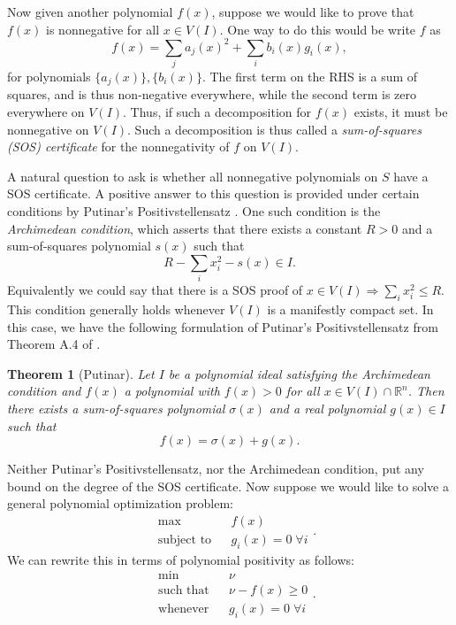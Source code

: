 \documentclass[aps,pra,notitlepage,preprintnumbers,11pt,tightenlines]{revtex4-1}
\newcommand{\RR}{\mathbb{R}}
\newcommand{\be}{\begin{equation}}
\newcommand{\ee}{\end{equation}}
\newtheorem{theorem}{Theorem}
\begin{document}
Now given another polynomial $f(x)$, suppose we would like to prove
that $f(x)$ is nonnegative for all $x\in V(I)$. One way to do this would be write
$f$ as
%
 \be f(x) = \sum_j a_j(x)^2 + \sum_i b_i(x) g_i(x), \ee 
%
for
polynomials $\{a_j(x)\}, \{b_i(x)\}$.  The first term on the RHS is a
sum of squares, and is thus non-negative everywhere, while the second
term is zero everywhere on $V(I)$. Thus, if such a decomposition for
$f(x)$ exists, it must be nonnegative on $V(I)$. Such a decomposition is
thus called a \emph{sum-of-squares (SOS) certificate} for the
nonnegativity of $f$ on $V(I)$.

A natural question to ask is whether all nonnegative polynomials on
$S$ have a SOS certificate. A positive answer to this question is
provided under certain conditions by Putinar's Positivstellensatz
\cite{putinar:1993}.   One such condition is the 
 {\em Archimedean condition}, which asserts that there exists a constant
$R>0$ and a sum-of-squares polynomial $s(x)$ such that
\be R - \sum_i x_i^2 - s(x) \in I .\ee
Equivalently we could say that there is a SOS proof of $x\in V(I)
\Rightarrow \sum_i x_i^2
\leq R$.
This condition generally holds whenever $V(I)$ is a
manifestly compact set.  In this case, we have the following
formulation of Putinar's Positivstellensatz from Theorem A.4 of \cite{nie:2010}.
\begin{theorem}[Putinar]
  Let $I$ be a polynomial ideal satisfying the Archimedean condition
  and $f(x)$ a
  polynomial with $f(x) > 0$ for all $x \in V(I) \cap \RR^n$.  Then there
  exists a sum-of-squares polynomial $\sigma(x)$ and a real
  polynomial $g(x) \in I$ such that
  \[ f(x) = \sigma(x) + g(x). \]
  \label{thm:psatz}
\end{theorem}
Neither Putinar's Positivstellensatz, nor the Archimedean condition, put any bound on the
degree of the SOS certificate. Now suppose we would like to solve a general polynomial optimization
problem:
\be \begin{aligned}
  \label{eq:polyopt}
  &\max && f(x) \\
  &\text{subject to} && g_i(x) = 0 \; \forall i
  \end{aligned}. \ee
 We can rewrite this in terms of polynomial positivity as follows:
\be \begin{aligned}
  &\min && \nu \\
  &\text{such that} &&\nu - f(x) \geq 0 \\
  &\text{whenever} &&g_i(x) = 0 \; \forall i
\end{aligned}. \ee
\end{document}
